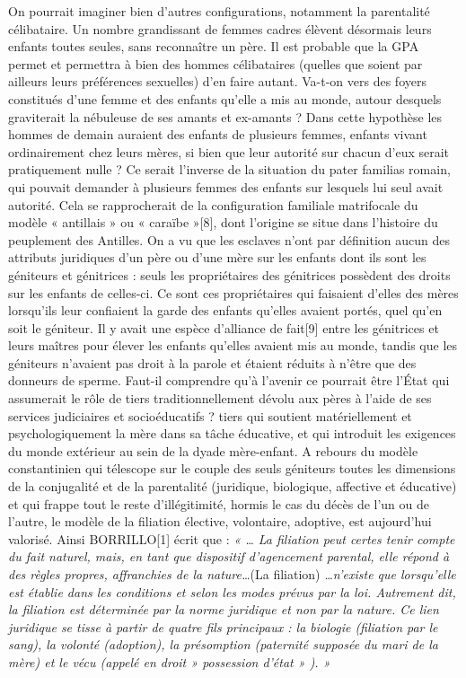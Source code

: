  On pourrait imaginer bien d'autres configurations, notamment la parentalité célibataire. Un nombre grandissant de femmes cadres élèvent désormais leurs enfants toutes seules, sans reconnaître un père. Il est probable que la GPA permet et permettra à bien des hommes célibataires (quelles que soient par ailleurs leurs préférences sexuelles) d'en faire autant.
 Va-t-on vers des foyers constitués d'une femme et des enfants qu'elle a mis au monde, autour desquels graviterait la nébuleuse de ses amants et ex-amants ? Dans cette hypothèse les hommes de demain auraient des enfants de plusieurs femmes, enfants vivant ordinairement chez leurs mères, si bien que leur autorité sur chacun d'eux serait pratiquement nulle ? Ce serait l'inverse de la situation du pater familias romain, qui pouvait demander à plusieurs femmes des enfants sur lesquels lui seul avait autorité. Cela se rapprocherait de la configuration familiale matrifocale du modèle « antillais » ou « caraïbe »[8], dont l'origine se situe dans l'histoire du peuplement des Antilles. On a vu que les esclaves n'ont par définition aucun des attributs juridiques d'un père ou d'une mère sur les enfants dont ils sont les géniteurs et génitrices : seuls les propriétaires des génitrices possèdent des droits sur les enfants de celles-ci. Ce sont ces propriétaires qui faisaient d'elles des mères lorsqu'ils leur confiaient la garde des enfants qu'elles avaient portés, quel qu'en soit le géniteur. Il y avait une espèce d'alliance de fait[9] entre les génitrices et leurs maîtres pour élever les enfants qu'elles avaient mis au monde, tandis que les géniteurs n'avaient pas droit à la parole et étaient réduits à n'être que des donneurs de sperme. 
 Faut-il comprendre qu'à l'avenir ce pourrait être l'État qui assumerait le rôle de tiers traditionnellement dévolu aux pères à l'aide de ses services judiciaires et socioéducatifs ? tiers qui soutient matériellement et psychologiquement la mère dans sa tâche éducative, et qui introduit les exigences du monde extérieur au sein de la dyade mère-enfant.
 A rebours du modèle constantinien qui télescope sur le couple des seuls géniteurs toutes les dimensions de la conjugalité et de la parentalité (juridique, biologique, affective et éducative) et qui frappe tout le reste d'illégitimité, hormis le cas du décès de l'un ou de l'autre, le modèle de la filiation élective, volontaire, adoptive, est aujourd'hui valorisé. 
 Ainsi BORRILLO[1] écrit que : \emph{« … La filiation peut certes tenir compte du fait naturel, mais, en tant que dispositif d'agencement parental, elle répond à des règles propres, affranchies de la nature…}(La filiation)\emph{ …n'existe que lorsqu'elle est établie dans les conditions et selon les modes prévus par la loi. Autrement dit, la filiation est déterminée par la norme juridique et non par la nature. Ce lien juridique se tisse à partir de quatre fils principaux : la biologie (filiation par le sang), la volonté (adoption), la présomption (paternité supposée du mari de la mère) et le vécu (appelé en droit » possession d'état » ). »}
